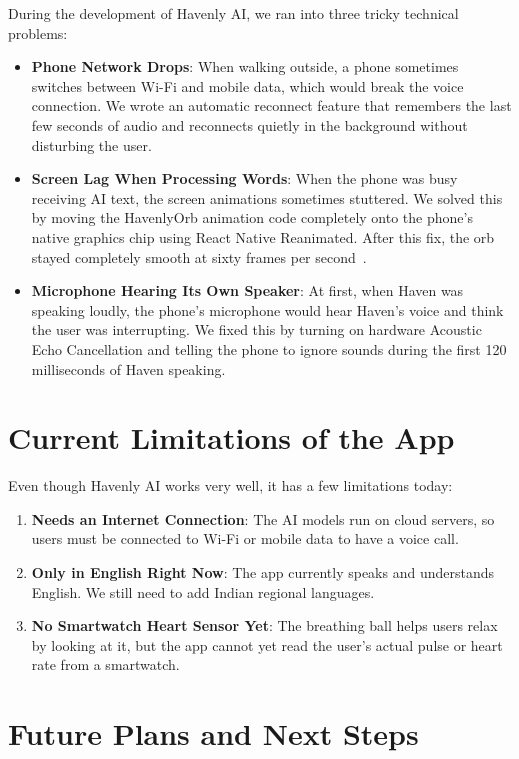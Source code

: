 During the development of Havenly AI, we ran into three tricky technical problems:
\begin{itemize}
    \item \textbf{Phone Network Drops}: When walking outside, a phone sometimes switches between Wi-Fi and mobile data, which would break the voice connection. We wrote an automatic reconnect feature that remembers the last few seconds of audio and reconnects quietly in the background without disturbing the user.
    \item \textbf{Screen Lag When Processing Words}: When the phone was busy receiving AI text, the screen animations sometimes stuttered. We solved this by moving the HavenlyOrb animation code completely onto the phone's native graphics chip using React Native Reanimated. After this fix, the orb stayed completely smooth at sixty frames per second~\cite{reactnative2024hermes}.
    \item \textbf{Microphone Hearing Its Own Speaker}: At first, when Haven was speaking loudly, the phone's microphone would hear Haven's voice and think the user was interrupting. We fixed this by turning on hardware Acoustic Echo Cancellation and telling the phone to ignore sounds during the first 120 milliseconds of Haven speaking.
\end{itemize}

\section{Current Limitations of the App}
\label{sec:concl_limitations}

Even though Havenly AI works very well, it has a few limitations today:
\begin{enumerate}
    \item \textbf{Needs an Internet Connection}: The AI models run on cloud servers, so users must be connected to Wi-Fi or mobile data to have a voice call.
    \item \textbf{Only in English Right Now}: The app currently speaks and understands English. We still need to add Indian regional languages.
    \item \textbf{No Smartwatch Heart Sensor Yet}: The breathing ball helps users relax by looking at it, but the app cannot yet read the user's actual pulse or heart rate from a smartwatch.
\end{enumerate}

\section{Future Plans and Next Steps}
\label{sec:concl_future_scope}

